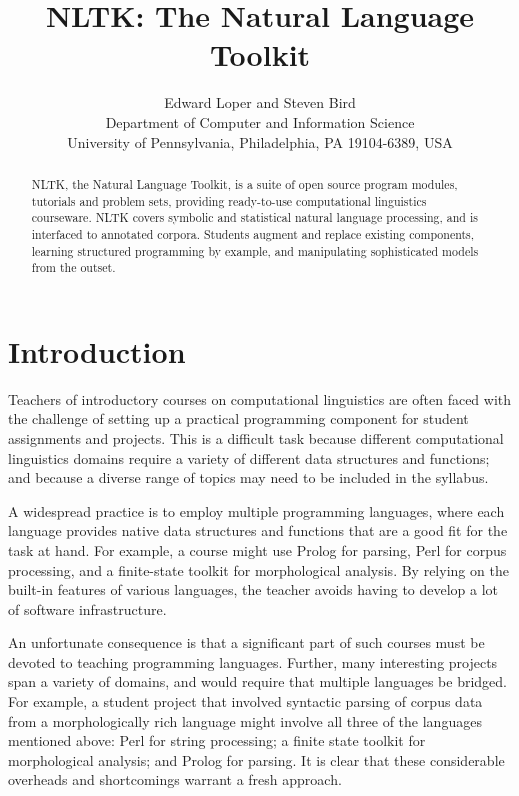 \documentclass[11pt]{article}
\title{NLTK: The Natural Language Toolkit}
\author{
Edward Loper and Steven Bird\\
Department of Computer and Information Science \\
University of Pennsylvania, Philadelphia, PA 19104-6389, USA
}
\date{}
\begin{document}
\maketitle

\begin{abstract}
NLTK, the Natural Language Toolkit, is a suite of open source program modules,
tutorials and problem sets, providing ready-to-use computational
linguistics courseware.  NLTK covers symbolic and statistical natural
language processing, and is interfaced to annotated corpora.  Students
augment and replace existing components, learning structured
programming by example, and manipulating sophisticated models from the
outset.
\end{abstract}

\section{Introduction}

Teachers of introductory courses on computational linguistics are
often faced with the challenge of setting up a practical programming
component for student assignments and projects.  This is a difficult
task because different computational linguistics domains require a
variety of different data structures and functions; and because a
diverse range of topics may need to be included in the syllabus.

A widespread practice is to employ multiple programming languages,
where each language provides native data structures and functions that
are a good fit for the task at hand.  For example, a course might use
Prolog for parsing, Perl for corpus processing, and a finite-state
toolkit for morphological analysis.  By relying on the built-in
features of various languages, the teacher avoids having to develop a
lot of software infrastructure.

An unfortunate consequence is that a significant part of such courses
must be devoted to teaching programming languages.  Further, many
interesting projects span a variety of domains, and would require that
multiple languages be bridged.  For example, a student project that
involved syntactic parsing of corpus data from a morphologically rich
language might involve all three of the languages mentioned above:
Perl for string processing; a finite state toolkit for morphological
analysis; and Prolog for parsing.
It is clear that these considerable overheads and shortcomings warrant
a fresh approach.
\end{document}
